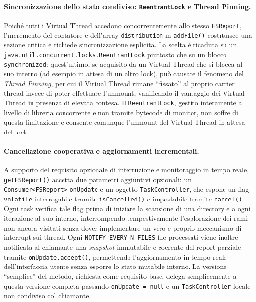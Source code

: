\documentclass[11pt,a4paper]{article}
\begin{document}
\paragraph{Sincronizzazione dello stato condiviso: \texttt{ReentrantLock} e Thread Pinning.}

Poiché tutti i Virtual Thread accedono concorrentemente allo stesso \texttt{FSReport}, l'incremento del contatore e dell'array \texttt{distribution} in \texttt{addFile()} costituisce una sezione critica e richiede sincronizzazione esplicita. La scelta è ricaduta su un \texttt{java.util.concurrent.locks.ReentrantLock} piuttosto che su un blocco \texttt{synchronized}: quest'ultimo, se acquisito da un Virtual Thread che si blocca al suo interno (ad esempio in attesa di un altro lock), può causare il fenomeno del \textit{Thread Pinning}, per cui il Virtual Thread rimane ``fissato'' al proprio carrier thread invece di poter effettuare l'unmount, vanificando il vantaggio dei Virtual Thread in presenza di elevata contesa. Il \texttt{ReentrantLock}, gestito interamente a livello di libreria concorrente e non tramite bytecode di monitor, non soffre di questa limitazione e consente comunque l'unmount del Virtual Thread in attesa del lock.

\paragraph{Cancellazione cooperativa e aggiornamenti incrementali.}

A supporto del requisito opzionale di interruzione e monitoraggio in tempo reale, \texttt{getFSReport()} accetta due parametri aggiuntivi opzionali: un \texttt{Consumer<FSReport>} \texttt{onUpdate} e un oggetto \texttt{TaskController}, che espone un flag \texttt{volatile} interrogabile tramite \texttt{isCancelled()} e impostabile tramite \texttt{cancel()}. Ogni task verifica tale flag prima di iniziare la scansione di una directory e a ogni iterazione al suo interno, interrompendo tempestivamente l'esplorazione dei rami non ancora visitati senza dover implementare un vero e proprio meccanismo di interrupt sui thread. Ogni \texttt{NOTIFY\_EVERY\_N\_FILES} file processati viene inoltre notificata al chiamante una \textit{snapshot} immutabile e coerente del report parziale tramite \texttt{onUpdate.accept()}, permettendo l'aggiornamento in tempo reale dell'interfaccia utente senza esporre lo stato mutabile interno. La versione ``semplice'' del metodo, richiesta come requisito base, delega semplicemente a questa versione completa passando \texttt{onUpdate = null} e un \texttt{TaskController} locale non condiviso col chiamante.
\end{document}
